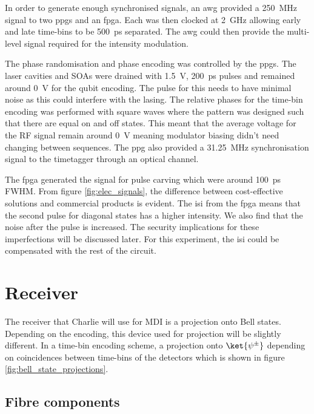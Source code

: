 
In order to generate enough synchronised signals, an \ac{awg} provided a \SI{250}{\MHz} signal to two \acp{ppg} and an \ac{fpga}. Each was then clocked at \SI{2}{GHz} allowing early and late time-bins to be \SI{500}{ps} separated. The \ac{awg} could then provide the multi-level signal required for the intensity modulation.

The phase randomisation and phase encoding was controlled by the \acp{ppg}. The laser cavities and \acp{SOA} were drained with \SI{1.5}{\V}, \SI{200}{ps} pulses and remained around \SI{0}{\V} for the qubit encoding. The pulse for this needs to have minimal noise as this could interfere with the lasing. The relative phases for the time-bin encoding was performed with square waves where the pattern was designed such that there are equal on and off states. This meant that the average voltage for the RF signal remain around \SI{0}{\V} meaning modulator biasing didn't need changing between sequences. The \ac{ppg} also provided a \SI{31.25}{MHz} synchronisation signal to the timetagger through an optical channel. 

The \ac{fpga} generated the signal for pulse carving which were around \SI{100}{ps} \ac{FWHM}. From figure \ref{fig:elec_signals}, the difference between cost-effective solutions and commercial products is evident. The \ac{isi} from the \ac{fpga} means that the second pulse for diagonal states has a higher intensity. We also find that the noise after the pulse is increased. The security implications for these imperfections will be discussed later. For this experiment, the \ac{isi} could be compensated with the rest of the circuit.  

\section{Receiver}

The receiver that Charlie will use for \ac{MDI} is a projection onto Bell states. Depending on the encoding, this device used for projection will be slightly different. In a time-bin encoding scheme, a projection onto $\ket{\psi^\pm}$ depending on coincidences between time-bins of the detectors which is shown in figure \ref{fig:bell_state_projections}.

\subsection{Fibre components}

